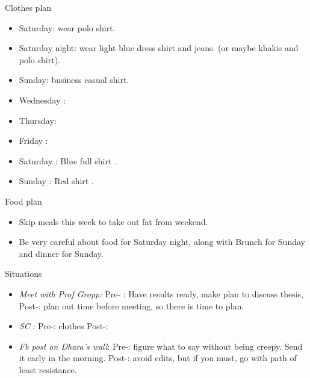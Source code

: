 \documentclass[serif, mathserif, final]{beamer}
\begin{document}
\begin{frame}{}
\begin{columns}
\begin{column}{0.25\linewidth}
  \begin{block}{Clothes plan} 
    \begin{itemize} 
      \tiny \item \tiny Saturday: wear polo shirt. 
    \item \tiny Saturday night: wear light blue dress shirt and jeans. (or maybe khakis and polo shirt). 
    \item \tiny Sunday: business casual shirt. 
    \item \tiny Wednesday : 
    \item \tiny Thursday: 
    \item \tiny Friday : 
    \item \tiny Saturday : Blue full shirt . 
    \item \tiny Sunday : Red shirt .
    \end{itemize} 
  \end{block} 
  \begin{block}{ Food plan } 
    \begin{itemize} 
      \tiny \item \tiny Skip meals this week to take out fat from weekend. 
    \item \tiny Be very careful about food for Saturday night, along with Brunch for Sunday and dinner for Sunday. 
    \end{itemize} 
  \end{block} 

  \begin{block}{Situations} 
    \begin{itemize} 
    \item \tiny \textit{Meet with Prof Gropp: } Pre- : Have results ready, make plan to discuss thesis, Post-: plan out time before meeting, so there is time to plan. 
    \item \tiny \textit{SC} : Pre-: clothes   Post-:  
    \item \tiny \textit{Fb post on Dhara's wall}: Pre-: figure what to
      say without being creepy.  Send it early in the morning.
      Post-: avoid edits, but if you must, go with path of least
      resistance. 
   
    \end{itemize}
  \end{block}


\end{column}
\end{columns}
\end{frame}
\end{document}
